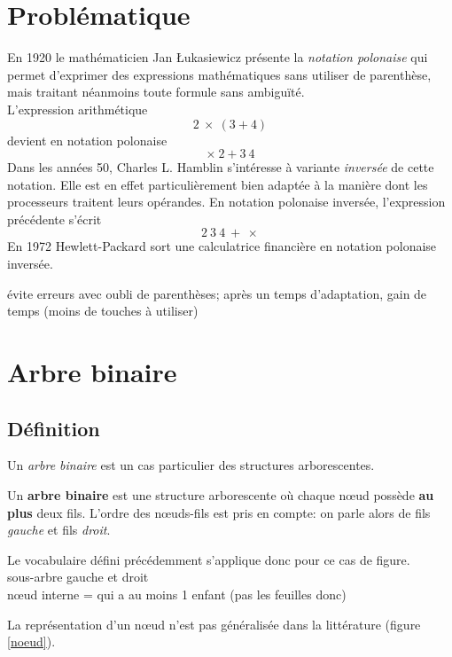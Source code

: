 \documentclass[a4paper,11pt]{article}
\begin{document}
\begin{Form}
\section{Problématique}
En 1920 le mathématicien Jan Łukasiewicz présente la \emph{notation polonaise} qui permet d'exprimer des expressions mathématiques sans utiliser de parenthèse, mais traitant néanmoins toute formule sans ambiguïté.\\
L'expression arithmétique 
$$2~×~(3+4)$$
devient en notation polonaise
$$×~2+3~4$$
Dans les années 50, Charles L. Hamblin s'intéresse à variante \emph{inversée} de cette notation. Elle est en effet particulièrement bien adaptée à la manière dont les processeurs traitent leurs opérandes.
En notation polonaise inversée, l'expression précédente s'écrit
$$2~3~4~+~×$$
En 1972 Hewlett-Packard sort une calculatrice financière en notation polonaise inversée. 
\begin{commentprof}
évite erreurs avec oubli de parenthèses; après un temps d'adaptation, gain de temps (moins de touches à utiliser)
\end{commentprof}
\begin{center}
\end{center}
\section{Arbre binaire}
\subsection{Définition}
Un \emph{arbre binaire} est un cas particulier des structures arborescentes.
\begin{aretenir}[]
Un \textbf{arbre binaire} est une structure arborescente où chaque nœud possède \textbf{au plus} deux fils. L'ordre des nœuds-fils est pris en compte: on parle alors de fils \emph{gauche} et fils \emph{droit}.
\end{aretenir}
\begin{commentprof}
Le vocabulaire défini précédemment s'applique donc pour ce cas de figure.\\
sous-arbre gauche et droit\\
nœud interne = qui a au moins 1 enfant (pas les feuilles donc)
\end{commentprof}
La représentation d'un nœud n'est pas généralisée dans la littérature (figure \ref{noeud}).
\begin{center}
\end{center}
\end{Form}
\end{document}
